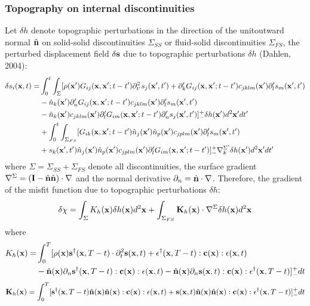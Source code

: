\subsubsection{Topography on internal discontinuities}
Let $\delta h$ denote topographic perturbations in the direction
of the unitoutward normal $\hat{\mathbf{n}}$ on
solid-solid discontinuities $\Sigma_{SS}$ or fluid-solid discontinuities $\Sigma_{FS}$,
the perturbed displacement field $\delta\mathbf{s}$ due to topographic perturbations $\delta h$
(Dahlen, 2004):
\begin{align*}
  \delta s_i(\mathbf{x},t)= & \int_0^t\int_\Sigma[\rho(\mathbf{x}')G_{ij}(\mathbf{x},\mathbf{x}';t-t')\partial_{t'}^2s_j(\mathbf{x}',t')+\partial_k^\prime G_{ij}(\mathbf{x},\mathbf{x}';t-t')c_{jklm}(\mathbf{x}')\partial_l^\prime s_m(\mathbf{x}',t') \\
    & -\hat{n}_k(\mathbf{x}')\partial_n^\prime G_{ij}(\mathbf{x},\mathbf{x}';t-t')c_{jklm}(\mathbf{x}')\partial_l^\prime s_m(\mathbf{x}',t') \\
	& -\hat{n}_k(\mathbf{x}')c_{jklm}(\mathbf{x}')\partial_l^\prime G_{im}(\mathbf{x},\mathbf{x}';t-t')\partial_n^\prime s_j(\mathbf{x}',t')]_-^+\delta h(\mathbf{x}')d^2\mathbf{x}'dt' \\
	& +\int_0^t\int_{\Sigma_{FS}}[G_{ik}(\mathbf{x},\mathbf{x}';t-t')\hat{n}_j(\mathbf{x}')\hat{n}_p(\mathbf{x}')c_{jplm}(\mathbf{x}')\partial_l^\prime s_m(\mathbf{x}',t') \\
	& +s_k(\mathbf{x}',t')\hat{n}_j(\mathbf{x}')\hat{n}_p(\mathbf{x}')c_{jplm}(\mathbf{x}')\partial_l^\prime G_{im}(\mathbf{x},\mathbf{x}';t-t')]_-^+\nabla_k^{\Sigma^\prime}\delta h(\mathbf{x}')d^2\mathbf{x}'dt'
\end{align*}
where $\Sigma=\Sigma_{SS}+\Sigma_{FS}$ denote all discontinuities,
the surface gradient $\nabla^\Sigma=(\mathbf{I}-\hat{\mathbf{n}}\hat{\mathbf{n}})\cdot\nabla$
and the normal derivative $\partial_n=\hat{\mathbf{n}}\cdot\nabla$.
Therefore, the gradient of the misfit function due to topographic perturbations $\delta h$:
\[ \delta\chi=\int_\Sigma K_h(\mathbf{x})\delta h(\mathbf{x})d^2\mathbf{x}+\int_{\Sigma_{FS}}\mathbf{K}_h(\mathbf{x})\cdot\nabla^\Sigma\delta h(\mathbf{x})d^2\mathbf{x} \]
where
\begin{align*}
  K_h(\mathbf{x})= & \int_0^T[\rho(\mathbf{x})\mathbf{s}^\dagger(\mathbf{x},T-t)\cdot\partial_t^2\mathbf{s}(\mathbf{x},t)+\mathbf{\epsilon}^\dagger(\mathbf{x},T-t):\mathbf{c}(\mathbf{x}):\mathbf{\epsilon}(\mathbf{x},t) \\
    & -\hat{\mathbf{n}}(\mathbf{x})\partial_n\mathbf{s}^\dagger(\mathbf{x},T-t):\mathbf{c}(\mathbf{x}):\mathbf{\epsilon}(\mathbf{x},t)-\hat{\mathbf{n}}(\mathbf{x})\partial_n\mathbf{s}(\mathbf{x},t):\mathbf{c}(\mathbf{x}):\mathbf{\epsilon}^\dagger(\mathbf{x},T-t)]_-^+dt
\end{align*}
\[ \mathbf{K}_h(\mathbf{x})=\int_0^T[\mathbf{s}^\dagger(\mathbf{x},T-t)\hat{\mathbf{n}}(\mathbf{x})\hat{\mathbf{n}}(\mathbf{x}):\mathbf{c}(\mathbf{x}):\mathbf{\epsilon}(\mathbf{x},t)+\mathbf{s}(\mathbf{x},t)\hat{\mathbf{n}}(\mathbf{x})\hat{\mathbf{n}}(\mathbf{x}):\mathbf{c}(\mathbf{x}):\mathbf{\epsilon}^\dagger(\mathbf{x},T-t)]_-^+dt \]
